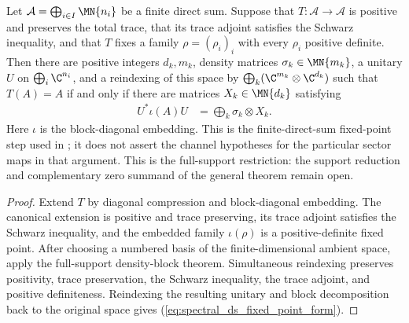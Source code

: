 \begin{theorem}%
    \label{thm:direct_sum_fixed_points_density_block_form}
    \leanok
    Let $\mathcal A=\bigoplus_{i\in I}\MN{n_i}$ be a finite direct sum.
    Suppose that $T:\mathcal A\to\mathcal A$ is positive and preserves the
    total trace, that its trace adjoint satisfies the Schwarz inequality,
    and that $T$ fixes a family $\rho=(\rho_i)_i$ with every $\rho_i$
    positive definite. Then there are positive integers $d_k,m_k$, density
    matrices $\sigma_k\in\MN{m_k}$, a unitary $U$ on
    $\bigoplus_i\C^{n_i}$, and a reindexing of this space by
    $\bigoplus_k(\C^{m_k}\otimes\C^{d_k})$ such that $T(A)=A$ if and only
    if there are matrices $X_k\in\MN{d_k}$ satisfying
    \begin{align}
        U^*\iota(A)U
         & =\bigoplus_k\sigma_k\otimes X_k.
        \label{eq:spectral_ds_fixed_point_form}
    \end{align}
    Here $\iota$ is the block-diagonal embedding. This is the
    finite-direct-sum fixed-point step used in
    \cite[Appendix~C.4, lines~1980--1995]{Cirac2016MPDO_arXiv}; it does not
    assert the channel hypotheses for the particular sector maps in that
    argument. This is the full-support restriction: the support reduction
    and complementary zero summand of the general theorem remain open.
\end{theorem}

\begin{proof}
    \leanok
    Extend $T$ by diagonal compression and block-diagonal embedding. The
    canonical extension is positive and trace preserving, its trace adjoint
    satisfies the Schwarz inequality, and the embedded family $\iota(\rho)$
    is a positive-definite fixed point. After choosing a numbered basis of
    the finite-dimensional ambient space, apply the full-support
    density-block theorem. Simultaneous reindexing preserves positivity,
    trace preservation, the Schwarz inequality, the trace adjoint, and
    positive definiteness. Reindexing the resulting unitary and block
    decomposition back to the original space gives
    (\ref{eq:spectral_ds_fixed_point_form}).
\end{proof}


